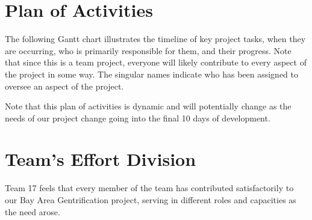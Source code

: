 \documentclass{article}
\begin{document}
\section{Plan of Activities}

The following Gantt chart illustrates the timeline of key project tasks, when they are occurring, who is primarily responsible for them, and their progress. Note that since this is a team project, everyone will likely contribute to every aspect of the project in some way. The singular names indicate who has been assigned to oversee an aspect of the project.



Note that this plan of activities is dynamic and will potentially change as the needs of our project change going into the final 10 days of development.

\section{Team's Effort Division}

Team 17 feels that every member of the team has contributed satisfactorily to our Bay Area Gentrification project, serving in different roles and capacities as the need arose.

\nocite{*}


\end{document}
